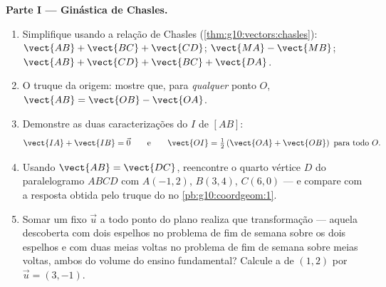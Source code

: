 \begin{problem}
\medskip
\noindent\textbf{Parte I --- Ginástica de Chasles.}
\begin{enumerate}
  \item Simplifique usando a relação de Chasles
        (\cref{thm:g10:vectors:chasles}):
        $\vect{AB} + \vect{BC} + \vect{CD}$; \quad
        $\vect{MA} - \vect{MB}$; \quad
        $\vect{AB} + \vect{CD} + \vect{BC} + \vect{DA}$.
  \item O truque da origem: mostre que, para \emph{qualquer} ponto
        $O$, $\vect{AB} = \vect{OB} - \vect{OA}$.
  \item Demonstre as duas caracterizações do  $I$ de
        $[AB]$:
        \[
        \vect{IA} + \vect{IB} = \vec 0
        \qquad\text{e}\qquad
        \vect{OI} = \tfrac12\left(\vect{OA} + \vect{OB}\right)
        \ \text{para todo } O .
        \]
  \item Usando $\vect{AB} = \vect{DC}$, reencontre o quarto
        vértice $D$ do paralelogramo $ABCD$ com $A(-1, 2)$,
        $B(3, 4)$, $C(6, 0)$ --- e compare com a resposta obtida
        pelo truque do  no
        \cref{pb:g10:coordgeom:1}.
  \item Somar um  fixo $\vec u$ a todo ponto do plano
        realiza que transformação --- aquela descoberta com dois
        espelhos no problema de fim de semana sobre os dois
        espelhos e com duas meias voltas no problema de fim de
        semana sobre meias voltas, ambos do volume do ensino
        fundamental? Calcule a  de $(1, 2)$ por
        $\vec u = (3, -1)$.
\end{enumerate}


\end{problem}
